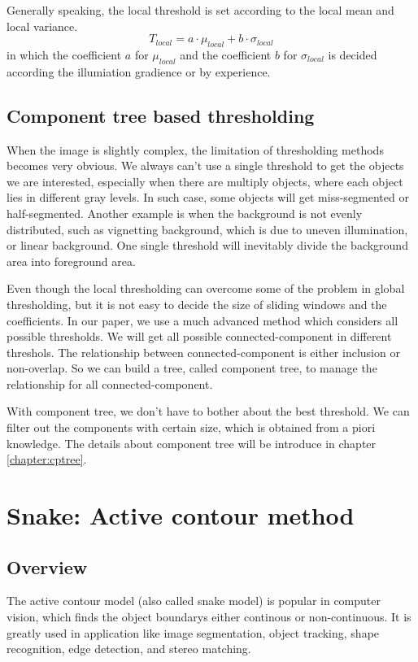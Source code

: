 Generally speaking, the local threshold is set according to the local mean and local variance.
\begin{equation}
T_{local} = a\cdot\mu_{local} + b\cdot\sigma_{local}
\end{equation}
in which the coefficient $a$ for $\mu_{local}$ and the coefficient $b$ for $\sigma_{local}$ is decided according the illumiation gradience or by experience.
\subsection{Component tree based thresholding} \label{sec:thresh-cptree}
When the image is slightly complex, the limitation of thresholding methods becomes very obvious. We always can't use a single threshold to get the objects we are interested, especially when there are multiply objects, where each object lies in different gray levels. In such case, some objects will get miss-segmented or half-segmented. Another example is when the background is not evenly distributed, such as vignetting background, which is due to uneven illumination, or linear background. One single threshold will inevitably divide the background area into foreground area.

Even though the local thresholding can overcome some of the problem in global thresholding, but it is not easy to decide the size of sliding windows and the coefficients. In our paper, we use a much advanced method which considers all possible thresholds. We will get all possible connected-component in different threshols. The relationship between connected-component is either inclusion or non-overlap. So we can build a tree, called component tree, to manage the relationship for all connected-component. 

With component tree, we don't have to bother about the best threshold. We can filter out the components with certain size, which is obtained from a piori knowledge. The details about component tree will be introduce in chapter \ref{chapter:cptree}.

\section{Snake: Active contour method}
\subsection{Overview}
The active contour model\cite{kass1988snakes} (also called snake model) is popular in computer vision, which finds the object boundarys either continous or non-continuous. It is greatly used in application like image segmentation, object tracking, shape recognition, edge detection, and stereo matching.

